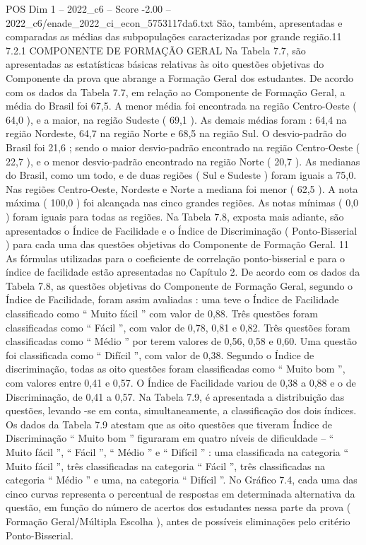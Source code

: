 \begin{textsample}{POS Dim 1 – 2022\_c6 – Score -2.00 – 2022\_c6/enade\_2022\_ci\_econ\_5753117da6.txt}
São, também, apresentadas e comparadas as médias das subpopulações caracterizadas por grande região.11 7.2.1 COMPONENTE DE FORMAÇÃO GERAL Na Tabela 7.7, são apresentadas as estatísticas básicas relativas às oito questões objetivas do Componente da prova que abrange a Formação Geral dos estudantes.
De acordo com os dados da Tabela 7.7, em relação ao Componente de Formação Geral, a média do Brasil foi 67,5.
A menor média foi encontrada na região Centro-Oeste ( 64,0 ), e a maior, na região Sudeste ( 69,1 ).
As demais médias foram : 64,4 na região Nordeste, 64,7 na região Norte e 68,5 na região Sul.
O desvio-padrão do Brasil foi 21,6 ; sendo o maior desvio-padrão encontrado na região Centro-Oeste ( 22,7 ), e o menor desvio-padrão encontrado na região Norte ( 20,7 ).
As medianas do Brasil, como um todo, e de duas regiões ( Sul e Sudeste ) foram iguais a 75,0.
Nas regiões Centro-Oeste, Nordeste e Norte a mediana foi menor ( 62,5 ).
A nota máxima ( 100,0 ) foi alcançada nas cinco grandes regiões.
As notas mínimas ( 0,0 ) foram iguais para todas as regiões.
Na Tabela 7.8, exposta mais adiante, são apresentados o Índice de Facilidade e o Índice de Discriminação ( Ponto-Bisserial ) para cada uma das questões objetivas do Componente de Formação Geral. 11 As fórmulas utilizadas para o coeficiente de correlação ponto-bisserial e para o índice de facilidade estão apresentadas no Capítulo 2.
De acordo com os dados da Tabela 7.8, as questões objetivas do Componente de Formação Geral, segundo o Índice de Facilidade, foram assim avaliadas : uma teve o Índice de Facilidade classificado como “ Muito fácil ” com valor de 0,88.
Três questões foram classificadas como “ Fácil ”, com valor de 0,78, 0,81 e 0,82.
Três questões foram classificadas como “ Médio ” por terem valores de 0,56, 0,58 e 0,60.
Uma questão foi classificada como “ Difícil ”, com valor de 0,38.
Segundo o Índice de discriminação, todas as oito questões foram classificadas como “ Muito bom ”, com valores entre 0,41 e 0,57.
O Índice de Facilidade variou de 0,38 a 0,88 e o de Discriminação, de 0,41 a 0,57.
Na Tabela 7.9, é apresentada a distribuição das questões, levando -se em conta, simultaneamente, a classificação dos dois índices.
Os dados da Tabela 7.9 atestam que as oito questões que tiveram Índice de Discriminação “ Muito bom ” figuraram em quatro níveis de dificuldade – “ Muito fácil ”, “ Fácil ”, “ Médio ” e “ Difícil ” : uma classificada na categoria “ Muito fácil ”, três classificadas na categoria “ Fácil ”, três classificadas na categoria “ Médio ” e uma, na categoria “ Difícil ”.
No Gráfico 7.4, cada uma das cinco curvas representa o percentual de respostas em determinada alternativa da questão, em função do número de acertos dos estudantes nessa parte da prova ( Formação Geral/Múltipla Escolha ), antes de possíveis eliminações pelo critério Ponto-Bisserial.

\end{textsample}
